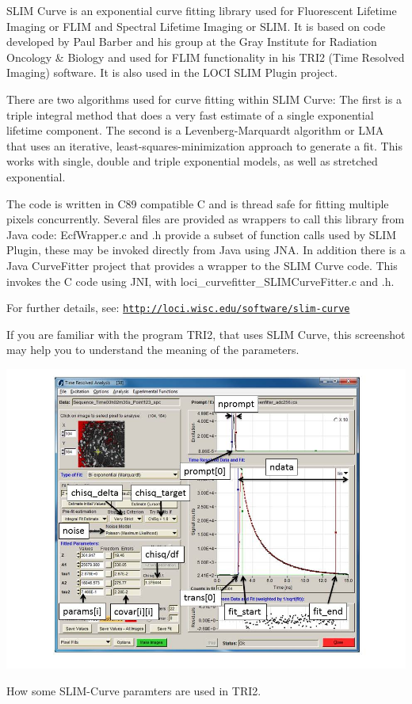 S\-L\-I\-M Curve is an exponential curve fitting library used for Fluorescent Lifetime Imaging or F\-L\-I\-M and Spectral Lifetime Imaging or S\-L\-I\-M. It is based on code developed by Paul Barber and his group at the Gray Institute for Radiation Oncology \& Biology and used for F\-L\-I\-M functionality in his T\-R\-I2 (Time Resolved Imaging) software. It is also used in the L\-O\-C\-I S\-L\-I\-M Plugin project.

There are two algorithms used for curve fitting within S\-L\-I\-M Curve\-: The first is a triple integral method that does a very fast estimate of a single exponential lifetime component. The second is a Levenberg-\/\-Marquardt algorithm or L\-M\-A that uses an iterative, least-\/squares-\/minimization approach to generate a fit. This works with single, double and triple exponential models, as well as stretched exponential.

The code is written in C89 compatible C and is thread safe for fitting multiple pixels concurrently. Several files are provided as wrappers to call this library from Java code\-: Ecf\-Wrapper.\-c and .h provide a subset of function calls used by S\-L\-I\-M Plugin, these may be invoked directly from Java using J\-N\-A. In addition there is a Java Curve\-Fitter project that provides a wrapper to the S\-L\-I\-M Curve code. This invokes the C code using J\-N\-I, with loci\-\_\-curvefitter\-\_\-\-S\-L\-I\-M\-Curve\-Fitter.\-c and .h.

For further details, see\-: \href{http://loci.wisc.edu/software/slim-curve}{\tt http\-://loci.\-wisc.\-edu/software/slim-\/curve}

If you are familiar with the program T\-R\-I2, that uses S\-L\-I\-M Curve, this screenshot may help you to understand the meaning of the parameters.

 
\begin{DoxyImage}
\includegraphics[width=15cm]{params_in_tri2.jpg}
\caption{How some S\-L\-I\-M-\/\-Curve paramters are used in T\-R\-I2.}
\end{DoxyImage}


